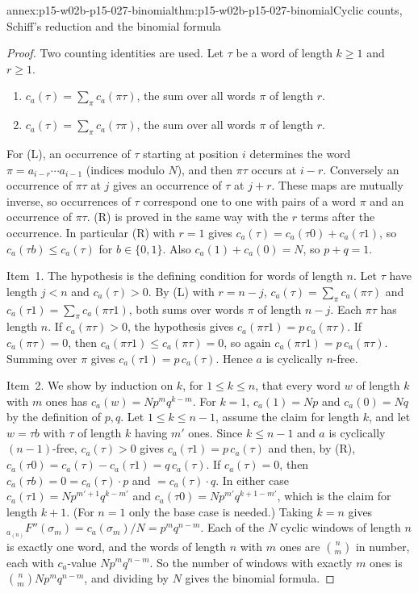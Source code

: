 \begin{annexitem}{annex:p15-w02b-p15-027-binomial}{thm:p15-w02b-p15-027-binomial}{Cyclic counts, Schiff's reduction and the binomial formula}
\begin{proof}
Two counting identities are used. Let \(\tau\) be a word of length
\(k\geq1\) and \(r\geq1\).
\begin{enumerate}
\item[(L)] \(c_a(\tau)=\sum_{\pi}c_a(\pi\tau)\), the sum over all words
  \(\pi\) of length \(r\).
\item[(R)] \(c_a(\tau)=\sum_{\pi}c_a(\tau\pi)\), the sum over all words
  \(\pi\) of length \(r\).
\end{enumerate}
For (L), an occurrence of \(\tau\) starting at position \(i\) determines
the word \(\pi=a_{i-r}\cdots a_{i-1}\) (indices modulo \(N\)), and then
\(\pi\tau\) occurs at \(i-r\). Conversely an occurrence of \(\pi\tau\) at
\(j\) gives an occurrence of \(\tau\) at \(j+r\). These maps are mutually
inverse, so occurrences of \(\tau\) correspond one to one with pairs of a
word \(\pi\) and an occurrence of \(\pi\tau\). (R) is proved in the same
way with the \(r\) terms after the occurrence. In particular (R) with
\(r=1\) gives \(c_a(\tau)=c_a(\tau0)+c_a(\tau1)\), so \(c_a(\tau b)\leq
c_a(\tau)\) for \(b\in\{0,1\}\). Also \(c_a(1)+c_a(0)=N\), so \(p+q=1\).

Item~1. The hypothesis is the defining condition for words of length
\(n\). Let \(\tau\) have length \(j<n\) and \(c_a(\tau)>0\). By (L) with
\(r=n-j\),
\(c_a(\tau)=\sum_\pi c_a(\pi\tau)\) and
\(c_a(\tau1)=\sum_\pi c_a(\pi\tau1)\), both sums over words \(\pi\) of
length \(n-j\). Each \(\pi\tau\) has length \(n\). If
\(c_a(\pi\tau)>0\), the hypothesis gives
\(c_a(\pi\tau1)=p\,c_a(\pi\tau)\). If \(c_a(\pi\tau)=0\), then
\(c_a(\pi\tau1)\leq c_a(\pi\tau)=0\), so again
\(c_a(\pi\tau1)=p\,c_a(\pi\tau)\). Summing over \(\pi\) gives
\(c_a(\tau1)=p\,c_a(\tau)\). Hence \(a\) is cyclically \(n\)-free.

Item~2. We show by induction on \(k\), for \(1\leq k\leq n\), that every
word \(w\) of length \(k\) with \(m\) ones has \(c_a(w)=Np^mq^{k-m}\).
For \(k=1\), \(c_a(1)=Np\) and \(c_a(0)=Nq\) by the definition of \(p,q\).
Let \(1\leq k\leq n-1\), assume the claim for length \(k\), and let
\(w=\tau b\) with \(\tau\) of length \(k\) having \(m'\) ones. Since
\(k\leq n-1\) and \(a\) is cyclically \((n-1)\)-free,
\(c_a(\tau)>0\) gives \(c_a(\tau1)=p\,c_a(\tau)\) and then, by (R),
\(c_a(\tau0)=c_a(\tau)-c_a(\tau1)=q\,c_a(\tau)\). If \(c_a(\tau)=0\), then
\(c_a(\tau b)=0=c_a(\tau)\cdot p\) and \(=c_a(\tau)\cdot q\). In either
case \(c_a(\tau1)=Np^{m'+1}q^{k-m'}\) and \(c_a(\tau0)=Np^{m'}q^{k+1-m'}\),
which is the claim for length \(k+1\). (For \(n=1\) only the base case is
needed.) Taking \(k=n\) gives
\({}_{a_{(n)}}F''(\sigma_m)=c_a(\sigma_m)/N=p^mq^{n-m}\). Each of the \(N\)
cyclic windows of length \(n\) is exactly one word, and the words of
length \(n\) with \(m\) ones are \(\binom{n}{m}\) in number, each with
\(c_a\)-value \(Np^mq^{n-m}\). So the number of windows with exactly
\(m\) ones is \(\binom{n}{m}Np^mq^{n-m}\), and dividing by \(N\) gives
the binomial formula.


\end{proof}
\end{annexitem}
